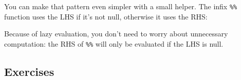 \documentclass[]{book}
\newenvironment{Shaded}{\begin{snugshade}}{\end{snugshade}}
\newcommand{\ControlFlowTok}[1]{\textcolor[rgb]{0.13,0.29,0.53}{\textbf{#1}}}
\newcommand{\DataTypeTok}[1]{\textcolor[rgb]{0.13,0.29,0.53}{#1}}
\newcommand{\KeywordTok}[1]{\textcolor[rgb]{0.13,0.29,0.53}{\textbf{#1}}}
\newcommand{\NormalTok}[1]{#1}
\newcommand{\OperatorTok}[1]{\textcolor[rgb]{0.81,0.36,0.00}{\textbf{#1}}}
\newcommand{\OtherTok}[1]{\textcolor[rgb]{0.56,0.35,0.01}{#1}}
\newcommand{\StringTok}[1]{\textcolor[rgb]{0.31,0.60,0.02}{#1}}
\theoremstyle{definition}
\theoremstyle{definition}
\theoremstyle{definition}
\theoremstyle{remark}
\begin{document}
You can make that pattern even simpler with a small helper. The infix
\texttt{\%\textbar{}\textbar{}\%} function uses the LHS if it's not
null, otherwise it uses the RHS:

\begin{Shaded}
\end{Shaded}

Because of lazy evaluation, you don't need to worry about unnecessary
computation: the RHS of \texttt{\%\textbar{}\textbar{}\%} will only be
evaluated if the LHS is null.

\hypertarget{exercises-2}{%
\subsection{Exercises}\label{exercises-2}}
\end{document}
